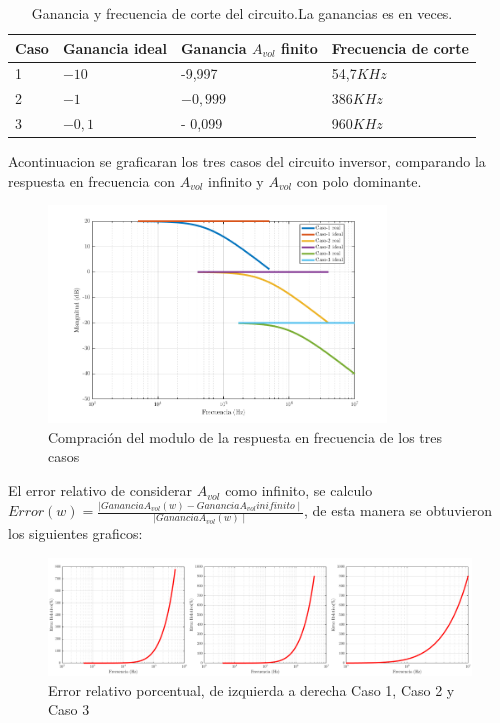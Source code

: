 \documentclass[../../main.tex]{subfiles}
\begin{document}
\begin{table}[h]
\begin{center}
\begin{tabular}{|l|l|l|l|}
\hline
Caso &Ganancia ideal & Ganancia $A_{vol}$ finito & Frecuencia de corte\\
\hline \hline
1 & $-10$ & -9,997 & 54,7$KHz$ \\ \hline
2 & $-1$ &  $-0,999 $ &  386$KHz$  \\ \hline
3 & $-0,1$ &- 0,099 &960$KHz$\\ \hline
\end{tabular}
\caption{Ganancia y frecuencia de corte del circuito.La ganancias es en veces.} 
\label{tab=gananciayFrecCorte}
\end{center}
\end{table}

Acontinuacion se graficaran los tres casos del circuito inversor, comparando la respuesta en frecuencia con  $A_{vol}$ infinito y $A_{vol}$ con polo dominante.

\begin{figure}[H]
\centering
\includegraphics[width=0.8\textwidth]{real_ideal_mag_inv}
\caption{Compración del modulo de la respuesta en frecuencia de los tres casos}
\end{figure}


El error relativo de considerar $A_{vol}$  como infinito, se calculo $ Error(w) = \frac {\mid Ganancia A_{vol}(w) -Ganancia A_{vol} inifinito \mid} {\mid Ganancia A_{vol} (w) \mid }$, de esta manera se obtuvieron los siguientes graficos:

\begin{figure}[H]
\centering
\includegraphics[width=1\textwidth]{error_inv}
\caption{Error relativo porcentual, de izquierda a derecha Caso 1, Caso 2 y Caso 3} \label{fig=errorInv}
\end{figure}
\end{document}
